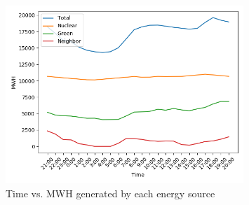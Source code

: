 \documentclass[article]{report} %
\begin{document}
    \begin{figure}[htpb]
    	\centering
	\includegraphics[width=0.8\textwidth]{figures/myplot.png}
    	\caption{Time vs. MWH generated by each energy source}
    	\label{fig:}
    \end{figure}
\end{document}
